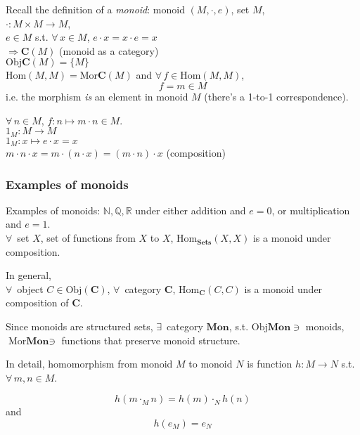 \documentclass[10pt]{amsart}
\begin{document}
\begin{multicols*}{2}
\begin{itemize}
Recall the definition of a \emph{monoid}:
monoid $(M, \cdot, e)$, set $M$, \\
$\cdot : M\times M \to M$, \\
$e \in M$ s.t. $\forall \, x \in M$, $e\cdot x = x \cdot e = x$ \\

$\Longrightarrow \mathbf{C}(M)$ (monoid as a category) \\
$\text{Obj}\mathbf{C}(M) = \lbrace M \rbrace$ \\
$\text{Hom}(M, M) = \text{Mor}\mathbf{C}(M)$ and $\forall \, f \in \text{Hom}(M, M)$, 
\[
f = m \in M
\]
i.e. the morphism \emph{is} an element in monoid $M$ (there's a 1-to-1 correspondence).

$\forall \, n \in M$, $f:n \mapsto m\cdot n \in M$. \\
$1_M : M \to M$ \\
$1_M : x \mapsto e\cdot x = x$ \\
$m\cdot n \cdot x = m\cdot (n\cdot x) = (m\cdot n) \cdot x$ (composition)


	
\subsubsection{Examples of monoids}
	Examples of monoids: $\mathbb{N}, \mathbb{Q}, \mathbb{R}$ under either addition and $e=0$, or multiplication and $e=1$. \\
	$\forall \, $ set $X$, set of functions from $X$ to $X$, $\text{Hom}_{\mathbf{Sets}}(X, X)$ is a monoid under composition. 
	
	In general, \\
	$\forall \, $ object $C \in \text{Obj}(\mathbf{C})$, $\forall \, $ category $\mathbf{C}$, $\text{Hom}_{\mathbf{C}}(C,C)$ is a monoid under composition of $\mathbf{C}$. 
	
	Since monoids are structured sets, $\exists \, $ category $\textbf{Mon}$, s.t. $\text{Obj}\mathbf{Mon} \ni $ monoids, $\text{Mor} \textbf{Mon} \ni $ functions that preserve monoid structure.
	
	In detail, homomorphism from monoid $M$ to monoid $N$ is function $h:M \to N$ s.t. $\forall \, m,n \in M$. 
	
	\[
	h(m \cdot_M n) = h(m) \cdot_N h(n)
	\]
	and
	\[
	h(e_M) =  e_N
	\]
	

\end{itemize}
\end{multicols*}
\end{document}
